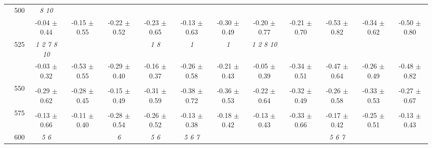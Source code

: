 \begin{table}[h]
{\begin{tabular}{
        ccccccccccccc}
 & \multirow{2}{*}{500}& \textit{  8 10 }& & & & & & & & & &  \\ 
 & & -0.04 $\pm$ 0.44& -0.15 $\pm$ 0.55& -0.22 $\pm$ 0.52& -0.23 $\pm$ 0.65& -0.13 $\pm$ 0.63& -0.30 $\pm$ 0.49& -0.20 $\pm$ 0.77& -0.21 $\pm$ 0.70& -0.53 $\pm$ 0.82& -0.34 $\pm$ 0.62& -0.50 $\pm$ 0.80 \\ 
 & \multirow{2}{*}{525}& \cellcolor[HTML]{EFEFEF} \textit{  1  2  7  8 10 }& \cellcolor[HTML]{EFEFEF} & \cellcolor[HTML]{EFEFEF} & \cellcolor[HTML]{EFEFEF} \textit{ 1 8 }& \cellcolor[HTML]{EFEFEF} \textit{ 1 }& \cellcolor[HTML]{EFEFEF} \textit{ 1 }& \cellcolor[HTML]{EFEFEF} \textit{  1  2  8 10 }& \cellcolor[HTML]{EFEFEF} & \cellcolor[HTML]{EFEFEF} & \cellcolor[HTML]{EFEFEF} & \cellcolor[HTML]{EFEFEF}  \\ 
 & & \cellcolor[HTML]{EFEFEF} -0.03 $\pm$ 0.32& \cellcolor[HTML]{EFEFEF} -0.53 $\pm$ 0.55& \cellcolor[HTML]{EFEFEF} -0.29 $\pm$ 0.40& \cellcolor[HTML]{EFEFEF} -0.16 $\pm$ 0.37& \cellcolor[HTML]{EFEFEF} -0.26 $\pm$ 0.58& \cellcolor[HTML]{EFEFEF} -0.21 $\pm$ 0.43& \cellcolor[HTML]{EFEFEF} -0.05 $\pm$ 0.39& \cellcolor[HTML]{EFEFEF} -0.34 $\pm$ 0.51& \cellcolor[HTML]{EFEFEF} -0.47 $\pm$ 0.64& \cellcolor[HTML]{EFEFEF} -0.26 $\pm$ 0.49& \cellcolor[HTML]{EFEFEF} -0.48 $\pm$ 0.82 \\ 
 & \multirow{2}{*}{550}& & & & & & & & & & &  \\ 
 & & -0.29 $\pm$ 0.62& -0.28 $\pm$ 0.45& -0.15 $\pm$ 0.49& -0.31 $\pm$ 0.59& -0.38 $\pm$ 0.72& -0.36 $\pm$ 0.53& -0.22 $\pm$ 0.64& -0.32 $\pm$ 0.49& -0.26 $\pm$ 0.58& -0.33 $\pm$ 0.53& -0.27 $\pm$ 0.67 \\ 
 & \multirow{2}{*}{575}& \cellcolor[HTML]{EFEFEF} & \cellcolor[HTML]{EFEFEF} & \cellcolor[HTML]{EFEFEF} & \cellcolor[HTML]{EFEFEF} & \cellcolor[HTML]{EFEFEF} & \cellcolor[HTML]{EFEFEF} & \cellcolor[HTML]{EFEFEF} & \cellcolor[HTML]{EFEFEF} & \cellcolor[HTML]{EFEFEF} & \cellcolor[HTML]{EFEFEF} & \cellcolor[HTML]{EFEFEF}  \\ 
 & & \cellcolor[HTML]{EFEFEF} -0.13 $\pm$ 0.66& \cellcolor[HTML]{EFEFEF} -0.11 $\pm$ 0.40& \cellcolor[HTML]{EFEFEF} -0.28 $\pm$ 0.54& \cellcolor[HTML]{EFEFEF} -0.26 $\pm$ 0.52& \cellcolor[HTML]{EFEFEF} -0.13 $\pm$ 0.38& \cellcolor[HTML]{EFEFEF} -0.18 $\pm$ 0.42& \cellcolor[HTML]{EFEFEF} -0.13 $\pm$ 0.43& \cellcolor[HTML]{EFEFEF} -0.33 $\pm$ 0.66& \cellcolor[HTML]{EFEFEF} -0.17 $\pm$ 0.42& \cellcolor[HTML]{EFEFEF} -0.25 $\pm$ 0.51& \cellcolor[HTML]{EFEFEF} -0.13 $\pm$ 0.43 \\ 
 & \multirow{2}{*}{600}& \textit{ 5 6 }& & \textit{ 6 }& \textit{ 5 6 }& \textit{ 5 6 7 }& & & & \textit{ 5 6 7 }& &  \\ 

\end{tabular}}
\end{table}
